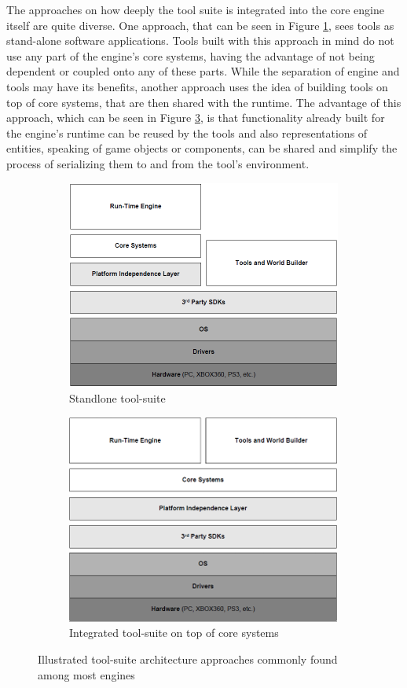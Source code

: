 The approaches on how deeply the tool suite is integrated into the core engine itself are quite diverse. One approach, that can be seen in Figure \ref{fig:tools_standalone}, sees tools as stand-alone software applications. Tools built with this approach in mind do not use any part of the engine's core systems, having the advantage of not being dependent or coupled onto any of these parts. 
While the separation of engine and tools may have its benefits, another approach uses the idea of building tools on top of core systems, that are then shared with the runtime. The advantage of this approach, which can be seen in Figure \ref{fig:tools_integrated}, is that functionality already built for the engine's runtime can be reused by the tools and also representations of entities, speaking of game objects or components, can be shared and simplify the process of serializing them to and from the tool's environment.

\begin{figure}[!ht]
	\begin{subfigure}{0.5\textwidth}
		\centering
		\centering \includegraphics[width=0.5 \linewidth]{PICs/tools_arch_standalone.png}
		\caption{Standlone tool-suite}
		\label{fig:tools_standalone}
	\end{subfigure}%
	\begin{subfigure}{0.5\textwidth}
		\centering
		\centering \includegraphics[width=0.5 \linewidth]{PICs/tools_arch_integrated.png}
		\caption{Integrated tool-suite on top of core systems}
		\label{fig:tools_integrated}
	\end{subfigure}
	
	\caption{Illustrated tool-suite architecture approaches commonly found among most engines}
\end{figure}

